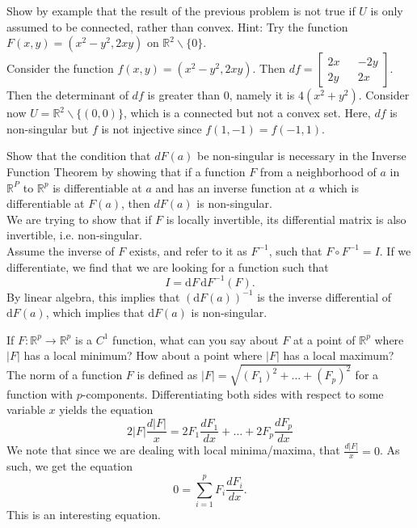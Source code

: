 \documentclass[12pt]{book}
\newcommand{\R}{\mathbb{R}}
\newenvironment{exercise}[2][Exercise]{\begin{trivlist}
\item[\hskip \labelsep {\bfseries #1}\hskip \labelsep {\bfseries #2.}]}{\end{trivlist}}
\begin{document}
\begin{exercise}{9.6.8}
    Show by example that the result of the previous problem is not true if $U$ is only assumed to be connected, rather than convex. Hint: Try the function $F(x,y) = (x^2 - y^2, 2 x y)$ on $\R^2 \backslash \{0\}$.  \\
    
    Consider the function $f(x,y) = (x^2-y^2, 2xy) $. Then $df = \begin{bmatrix} 2x && -2y\\ 2y && 2x \end{bmatrix} $. Then the determinant of $df$ is greater than 0, namely it is $4(x^2+y^2)$. Consider now $U=\R^2 \backslash \{(0,0)\}$, which is a connected but not a convex set. Here, $df$ is non-singular but $f$ is not injective since $f(1,-1)=f(-1,1)$.
\end{exercise}





\begin{exercise}{9.6.10}
    Show that the condition that $d F(a)$ be non-singular is necessary in the Inverse Function Theorem by showing that if a function $F$ from a neighborhood of $a$ in $\R^P$ to $\R^p$ is differentiable at $a$ and has an inverse function at $a$ which is differentiable at $F(a)$, then $d F(a)$ is non-singular.  \\
    
    We are trying to show that if $F$ is locally invertible, its differential matrix is also invertible, i.e. non-singular. \\
 Assume the inverse of $F$ exists, and refer to it as $F^{-1}$, such that $F \circ F^{-1} = I$. If we differentiate, we find that we are looking for a function such that
    \[ I = \text{d} F \, \text{d} F^{-1} \left( F \right) . \]
    By linear algebra, this implies that $( \text{d} F(a) )^{-1}$ is the inverse differential of $\text{d} F(a)$, which implies that $\text{d} F(a)$ is non-singular.
\end{exercise}




\begin{exercise}{9.6.12}
    If $F: \R^p \to \R^p$  is a $C^1$ function, what can you say about $F$ at a point of $\R^p$ where $|F|$ has a local minimum? How about a point where $|F|$ has a local maximum?  \\
    
    The norm of a function $F$ is defined as $|F| = \sqrt{ (F_1)^2 + \hdots + (F_p)^2}$ for a function with $p$-components. Differentiating both sides with respect to some variable $x$ yields the equation
    \[ 2 |F| \frac{d |F|}{x} = 2 F_1 \frac{d F_1}{d x} + \hdots + 2 F_p \frac{d F_p}{d x} \]
    We note that since we are dealing with local minima/maxima, that $\frac{d |F|}{x}=0$. As such, we get the equation
    \[ 0 = \sum_{i=1}^p F_i \frac{d F_i}{dx}. \]
    This is an interesting equation.
\end{exercise}
\end{document}
